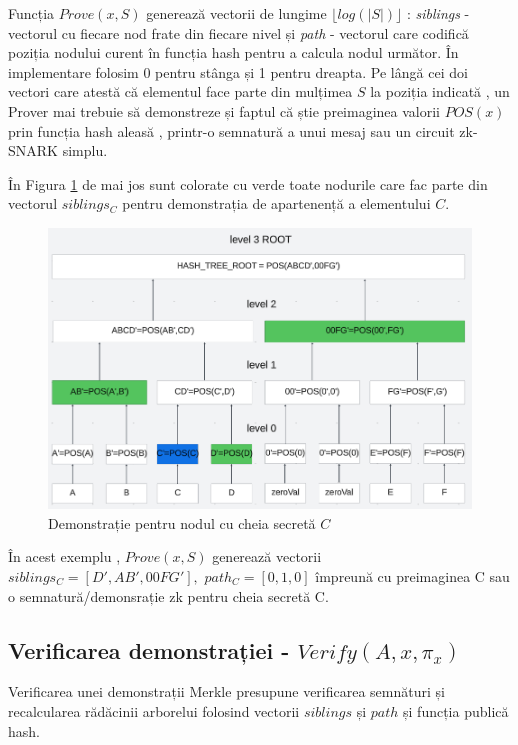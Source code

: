 \documentclass[12pt, letterpaper]{article}
\begin{document}
Funcția $Prove(x,S)$ generează vectorii de lungime $\lfloor log(|S|) \rfloor$ : \emph{siblings} - vectorul cu fiecare nod frate din fiecare nivel și \emph{path} - vectorul care codifică poziția nodului curent în funcția hash pentru a calcula nodul următor. În implementare folosim 0 pentru stânga și 1 pentru dreapta. Pe lângă cei doi vectori care atestă că elementul face parte din mulțimea $S$ la poziția indicată , un Prover mai trebuie să demonstreze și faptul că știe preimaginea valorii $POS(x)$ prin funcția hash aleasă , printr-o semnatură a unui mesaj sau un circuit zk-SNARK simplu.

În Figura \ref{fig:demonstrație_arbore_hash} de mai jos sunt colorate cu verde toate nodurile care fac parte din vectorul $siblings_C$ pentru demonstrația de apartenență a elementului $C$.

\pagebreak

\begin{figure}[ht]
    \centering
    \includegraphics[width=1\textwidth]{hashtreeProof.png}
    \caption{Demonstrație pentru nodul cu cheia secretă $C$}
    \label{fig:demonstrație_arbore_hash}
\end{figure}

În acest exemplu , $Prove(x,S)$ generează vectorii $siblings_C= [ D',AB',00FG' ],$
$path_C=[0,1,0]$ împreună cu preimaginea C sau o semnatură/demonsrație zk pentru cheia secretă C.

\subsection{Verificarea demonstrației - $Verify(A,x,\pi_x)$}

Verificarea unei demonstrații Merkle presupune verificarea semnături și recalcularea rădăcinii arborelui folosind vectorii $siblings$ și $path$ și funcția publică hash.
\end{document}
